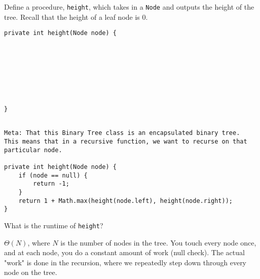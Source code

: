 \question Define a procedure, \texttt{height}, which takes in a \texttt{Node} and outputs the height of the tree. Recall that the height of a leaf node is 0.

\ifprintanswers
\else
\begin{lstlisting}
private int height(Node node) {








}
\end{lstlisting}
\fi

\begin{solution}
\begin{lstlisting}

Meta: That this Binary Tree class is an encapsulated binary tree.  
This means that in a recursive function, we want to recurse on that 
particular node.

private int height(Node node) {
    if (node == null) {
        return -1;
    }
    return 1 + Math.max(height(node.left), height(node.right));
}
\end{lstlisting}
\end{solution}

What is the runtime of \texttt{height}?
\begin{solution}[0.25in]
$\Theta(N)$, where $N$ is the number of nodes in the tree.  You touch every node once, and at each node, you do a constant amount of work (null check).  The actual "work" is done in the recursion, where we repeatedly step down through every node on the tree.

\end{solution}
